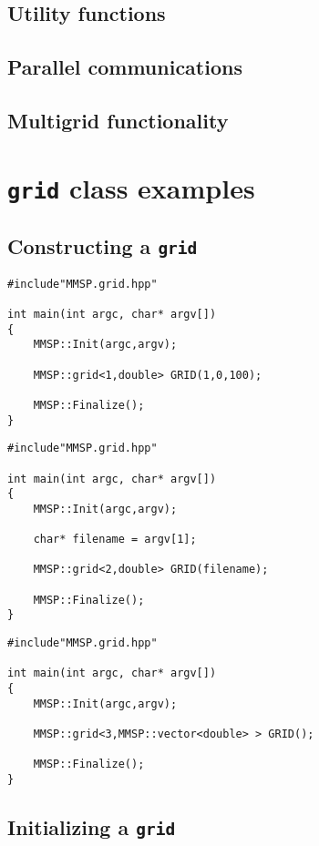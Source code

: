 \subsection{Utility functions}


\subsection{Parallel communications}

\subsection{Multigrid functionality}


\section{{\tt grid} class examples}

\subsection{Constructing a {\tt grid}}
\begin{verbatim}
#include"MMSP.grid.hpp"

int main(int argc, char* argv[])
{
    MMSP::Init(argc,argv);

	MMSP::grid<1,double> GRID(1,0,100);

    MMSP::Finalize();
}
\end{verbatim}

\begin{verbatim}
#include"MMSP.grid.hpp"

int main(int argc, char* argv[])
{
    MMSP::Init(argc,argv);

    char* filename = argv[1];

	MMSP::grid<2,double> GRID(filename);

    MMSP::Finalize();
}
\end{verbatim}

\begin{verbatim}
#include"MMSP.grid.hpp"

int main(int argc, char* argv[])
{
    MMSP::Init(argc,argv);

	MMSP::grid<3,MMSP::vector<double> > GRID();

    MMSP::Finalize();
}
\end{verbatim}
\subsection{Initializing a {\tt grid}}
